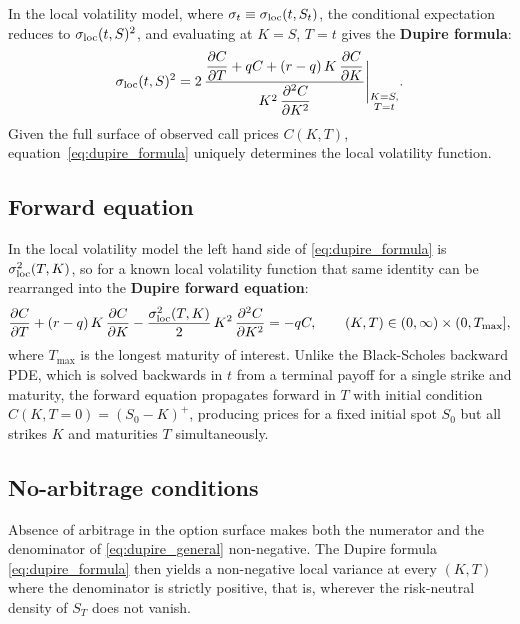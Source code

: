 In the local volatility model, where $\sigma_t \equiv \sigma_{\mathrm{loc}}(t, S_t)$,
the conditional expectation reduces to $\sigma_{\mathrm{loc}}(t,S)^2$,
and evaluating at $K = S$, $T = t$ gives the \textbf{Dupire formula}:
\begin{equation}\label{eq:dupire_formula}
    \sigma_{\mathrm{loc}}(t, S)^2 = 2\,\frac{
        \dfrac{\partial C}{\partial T} + qC + (r-q)\,K\,\dfrac{\partial C}{\partial K}
    }{
        K^2\,\dfrac{\partial^2 C}{\partial K^2}
    }\Bigg|_{\substack{K = S,\\ T = t}}.
\end{equation}
Given the full surface of observed call prices $C(K,T)$,
equation~\eqref{eq:dupire_formula} uniquely determines the local volatility function.

\subsection{Forward equation}

In the local volatility model the left hand side of \eqref{eq:dupire_formula} is $\sigma_{\mathrm{loc}}^2(T, K)$,
so for a known local volatility function that same identity can be rearranged
into the \textbf{Dupire forward equation}:
\begin{equation}\label{eq:dupire_forward}
    \frac{\partial C}{\partial T} + (r-q)\,K\,\frac{\partial C}{\partial K}
    - \frac{\sigma_{\mathrm{loc}}^2(T,K)}{2}\,K^2\,\frac{\partial^2 C}{\partial K^2} = -qC,
    \qquad (K, T) \in (0, \infty) \times (0, T_{\max}],
\end{equation}
where $T_{\max}$ is the longest maturity of interest.
Unlike the Black-Scholes backward PDE, which is solved backwards in $t$
from a terminal payoff for a single strike and maturity,
the forward equation propagates forward in $T$ with initial condition
$C(K, T = 0) = (S_0 - K)^+$,
producing prices for a fixed initial spot $S_0$ but all strikes $K$ and maturities $T$ simultaneously.

\subsection{No-arbitrage conditions}\label{sec:no_arbitrage}

Absence of arbitrage in the option surface makes both the numerator and the denominator of \eqref{eq:dupire_general} non-negative.
The Dupire formula \eqref{eq:dupire_formula} then yields a non-negative local variance
at every $(K, T)$ where the denominator is strictly positive,
that is, wherever the risk-neutral density of $S_T$ does not vanish.

